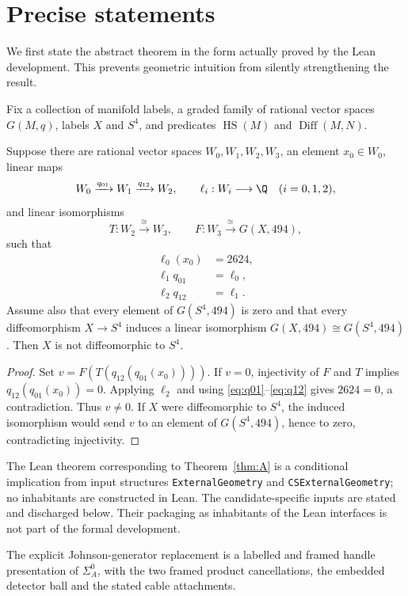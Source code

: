\section{Precise statements}

We first state the abstract theorem in the form actually proved by the Lean
development.  This prevents geometric intuition from silently strengthening
the result.

Fix a collection of manifold labels, a graded family of rational vector
spaces $G(M,q)$, labels $X$ and $S^4$, and predicates
\(\operatorname{HS}(M)\) and \(\operatorname{Diff}(M,N)\).

\begin{theorem}\label{thm:A}
Suppose there are rational vector spaces $W_0,W_1,W_2,W_3$, an element
$x_0\in W_0$, linear maps
\[
W_0\xrightarrow{q_{01}}W_1\xrightarrow{q_{12}}W_2,
\qquad
\ell_i:W_i\longrightarrow\Q\quad (i=0,1,2),
\]
and linear isomorphisms
\[
T:W_2\xrightarrow{\cong}W_3,
\qquad
F:W_3\xrightarrow{\cong}G(X,494),
\]
such that
\begin{align}
\ell_0(x_0)&=2624,\label{eq:value}\\
\ell_1q_{01}&=\ell_0,\label{eq:q01}\\
\ell_2q_{12}&=\ell_1.\label{eq:q12}
\end{align}
Assume also that every element of $G(S^4,494)$ is zero and that every
diffeomorphism $X\to S^4$ induces a linear isomorphism
\(G(X,494)\cong G(S^4,494)\).  Then $X$ is not diffeomorphic to $S^4$.
\end{theorem}

\begin{proof}
Set $v=F(T(q_{12}(q_{01}(x_0))))$.  If $v=0$, injectivity of $F$ and $T$
implies $q_{12}(q_{01}(x_0))=0$.  Applying $\ell_2$ and using
\eqref{eq:q01}--\eqref{eq:q12} gives $2624=0$, a contradiction.  Thus
$v\ne0$.  If $X$ were diffeomorphic to $S^4$, the induced isomorphism would
send $v$ to an element of $G(S^4,494)$, hence to zero, contradicting
injectivity.
\end{proof}

The Lean theorem corresponding to Theorem~\ref{thm:A} is a conditional
implication from input structures \texttt{ExternalGeometry} and
\texttt{CSExternalGeometry}; no inhabitants are constructed in Lean.
The candidate-specific inputs are stated and discharged below.  Their packaging
as inhabitants of the Lean interfaces is not part of the formal development.

\begin{theorem}\label{hyp:P0}
The explicit Johnson-generator replacement is a labelled and framed handle
presentation of $\Sigma_A^0$, with the two framed product cancellations, the
embedded detector ball and the stated cable attachments.
\end{theorem}

